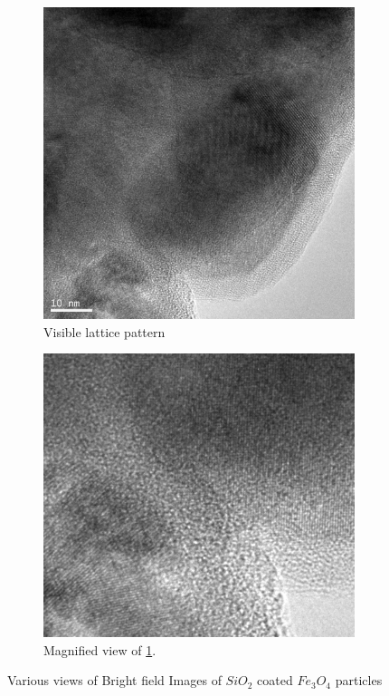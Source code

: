 \documentclass[12pt,a4paper]{article}
\begin{document}
\begin{figure}[htbp]
  \begin{subfigure}[b]{0.45\textwidth}
    \includegraphics[width=\textwidth]{Data/Fe3O4-SiO2-0003.png}
    \caption{Visible lattice pattern}
    \label{fig:viewc}
  \end{subfigure}
  \begin{subfigure}[b]{0.45\textwidth}
    \includegraphics[width=\textwidth]{Data/Fe3O4-SiO2-0003-zoom.png}
    \caption{Magnified view of \ref{fig:viewc}.  }
    \label{fig:zoom}
  \end{subfigure}
  
  \caption{Various views of Bright field Images of $SiO_2$ coated $Fe_3O_4$ particles}\label{fig:brightfield}
\end{figure}
\end{document}
